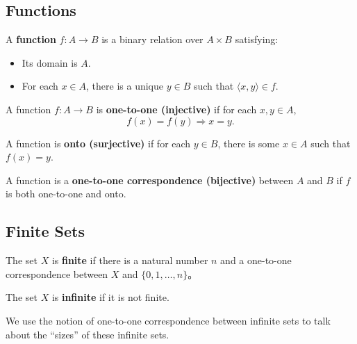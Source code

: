 \subsection{Functions}
\label{sub:Function}
\begin{definition}[Functions]
    \label{def:Function}
    A \textbf{function} $f: A \rightarrow B$ is a binary relation over $A \times B$ satisfying:
    \begin{itemize}
        \item Its domain is $A$.
        \item For each $x \in A$, there is a unique $y \in B$ such that $\langle x, y \rangle \in f$.
    \end{itemize}
\end{definition}

\begin{definition}
    \label{def:Injective}
    A function $f: A \rightarrow B$ is \textbf{one-to-one (injective)} if for each $x, y \in A$,
    \[ f(x) = f(y) \Longrightarrow x = y. \]
\end{definition}

\begin{definition}
    \label{def:Surjective}
    A function is \textbf{onto (surjective)} if for each $y \in B$, there is some $x \in A$ such that $f(x) = y$.
\end{definition}

\begin{definition}
    \label{def:Bijective}
    A function is a \textbf{one-to-one correspondence (bijective)} between $A$ and $B$ if $f$ is both one-to-one and onto.
\end{definition}

\subsection{Finite Sets}
\label{sub:FiniteSets}
\begin{definition}
    \label{def:FiniteSets}
    The set $X$ is \textbf{finite} if there is a natural number $n$ and a one-to-one correspondence between $X$ and $\{0, 1, \dots, n\}$。

    The set $X$ is \textbf{infinite} if it is not finite.
\end{definition}

We use the notion of one-to-one correspondence between infinite sets to talk about the ``sizes'' of these infinite sets.


